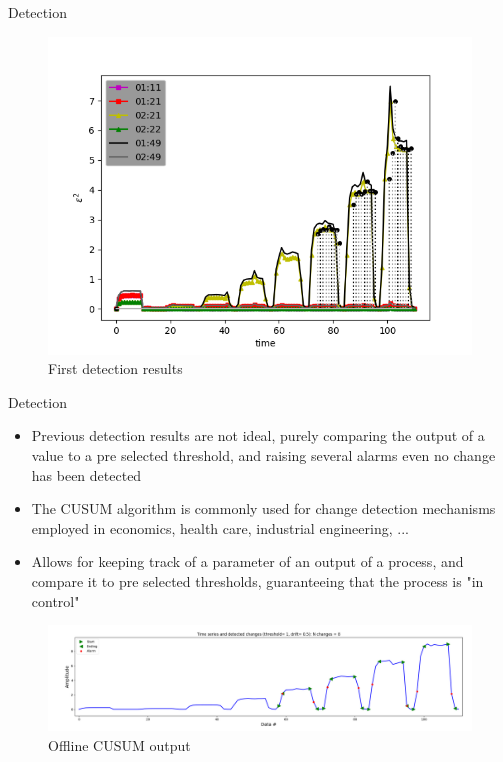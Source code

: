 \documentclass{beamer}
\begin{document}
\begin{frame}{Detection}
    \begin{figure}
        \includegraphics[width=.8\textwidth]{meter_eleph/detect_dumb}
        \caption{First detection results}
    \end{figure}
\end{frame}

\begin{frame}{Detection}
    \begin{itemize}

        \item Previous detection results are not ideal, purely comparing the output
            of a value to a pre selected threshold, and raising several alarms
            even no change has been detected
            \pause

        \item The CUSUM algorithm is commonly used for change detection mechanisms employed
            in economics, health care, industrial engineering, ...
        \item Allows for keeping track of a parameter of an output of a process, and 
            compare it to pre selected thresholds, guaranteeing that the process is "in control"
    \end{itemize}
    \pause
    \begin{figure}
        \includegraphics[width=1\textwidth]{meter_eleph/offline_cusum_output}
        \caption{Offline CUSUM output}
    \end{figure}
\end{frame}
\end{document}
